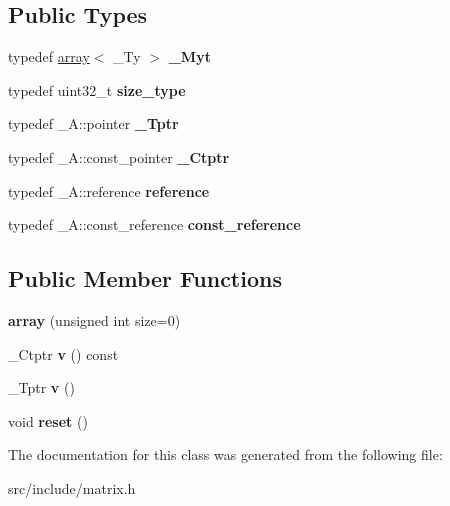 \subsection*{Public Types}
\begin{DoxyCompactItemize}
\item 
\mbox{\label{classupc_1_1array_a9c800a9bf971fc1d7c02a34803f87115}} 
typedef \hyperlink{classupc_1_1array}{array}$<$ \+\_\+\+Ty $>$ {\bfseries \+\_\+\+Myt}
\item 
\mbox{\label{classupc_1_1array_a85501f086a20ed6686ef78a242b2f302}} 
typedef uint32\+\_\+t {\bfseries size\+\_\+type}
\item 
\mbox{\label{classupc_1_1array_a4ef66945898a2c393cff5be41de077d2}} 
typedef \+\_\+\+A\+::pointer {\bfseries \+\_\+\+Tptr}
\item 
\mbox{\label{classupc_1_1array_a420718228a4d845721303a19755f0d42}} 
typedef \+\_\+\+A\+::const\+\_\+pointer {\bfseries \+\_\+\+Ctptr}
\item 
\mbox{\label{classupc_1_1array_a99066373537d57ee780ce4d3396314f8}} 
typedef \+\_\+\+A\+::reference {\bfseries reference}
\item 
\mbox{\label{classupc_1_1array_a3b639eaadbf9a2c410d7c02d3d1c01e4}} 
typedef \+\_\+\+A\+::const\+\_\+reference {\bfseries const\+\_\+reference}
\end{DoxyCompactItemize}
\subsection*{Public Member Functions}
\begin{DoxyCompactItemize}
\item 
\mbox{\label{classupc_1_1array_a91a96a5d4ba2076aa8d221916d8376a2}} 
{\bfseries array} (unsigned int size=0)
\item 
\mbox{\label{classupc_1_1array_a80705655cd83dd14ad6dc38f6711f139}} 
\+\_\+\+Ctptr {\bfseries v} () const
\item 
\mbox{\label{classupc_1_1array_a1b5e50b24d426dd6652139190c0d5b62}} 
\+\_\+\+Tptr {\bfseries v} ()
\item 
\mbox{\label{classupc_1_1array_aeb72a62336fc9474afdf3fa6f5cea9ca}} 
void {\bfseries reset} ()
\end{DoxyCompactItemize}


The documentation for this class was generated from the following file\+:\begin{DoxyCompactItemize}
\item 
src/include/matrix.\+h\end{DoxyCompactItemize}
